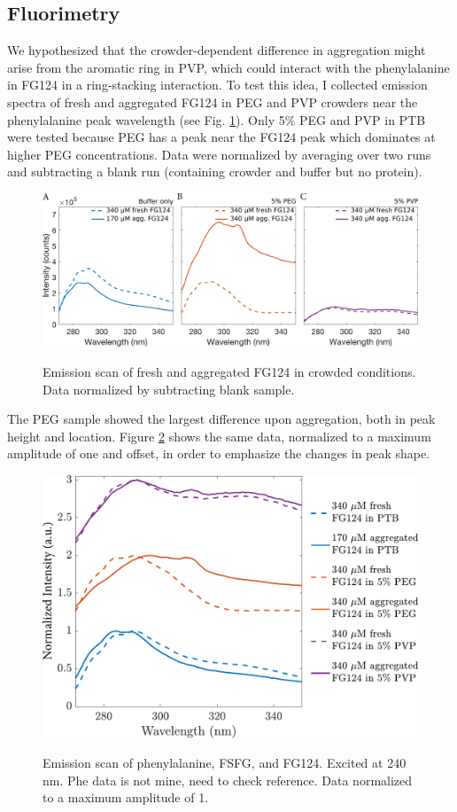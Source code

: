 \subsection{Fluorimetry}
We hypothesized that the crowder-dependent difference in aggregation might arise from the aromatic ring in PVP, which could interact with the phenylalanine in FG124 in a ring-stacking interaction.  To test this idea, I collected emission spectra of fresh and aggregated FG124 in PEG and PVP crowders near the phenylalanine peak wavelength (see Fig. \ref{fig:FG124-fresh-vs-agg}).  Only 5\% PEG and PVP in PTB were tested because PEG has a peak near the FG124 peak which dominates at higher PEG concentrations.  Data were normalized by averaging over two runs and subtracting a blank run (containing crowder and buffer but no protein).
\begin{figure}
\caption{Emission scan of fresh and aggregated FG124 in crowded conditions.  Data normalized by subtracting blank sample.}
\centering
\includegraphics[width=1.1\textwidth]{figs/ch05/FG124-fresh-vs-agg}
\label{fig:FG124-fresh-vs-agg}
\end{figure}
The PEG sample showed the largest difference upon aggregation, both in peak height and location.  Figure \ref{fig:stacked-FG124-fluorimetry} shows the same data, normalized to a maximum amplitude of one and offset, in order to emphasize the changes in peak shape.
\begin{figure}
\caption{Emission scan of phenylalanine, FSFG, and FG124. Excited at 240 nm.  Phe data is not mine, need to check reference. Data normalized to a maximum amplitude of 1.}
\centering
\includegraphics[width=\textwidth]{figs/ch05/stacked-FG124-fluorimetry}
\label{fig:stacked-FG124-fluorimetry}
\end{figure}
